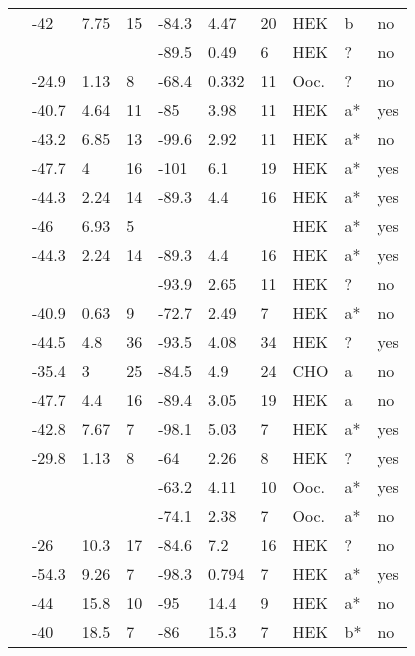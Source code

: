 \begin{footnotesize}
\begin{longtable}{p{5cm}|lll|lll|lll}
\citet{Valdivia2004MutationDB} & -42 & 7.75 & 15 & -84.3 & 4.47 & 20 & HEK & b & no \\
\citet{Vatta2002aMutationDB} & && & -89.5 & 0.49 & 6 & HEK & ? & no \\
\citet{Vatta2002bMutationDB} & -24.9 & 1.13 & 8 & -68.4 & 0.332 & 11 & Ooc. & ? & no \\
\citet{Viswanathan2003MutationDB} & -40.7 & 4.64 & 11 & -85 & 3.98 & 11 & HEK & a* & yes \\
\citet{Wang1996MutationDB} & -43.2 & 6.85 & 13 & -99.6 & 2.92 & 11 & HEK & a* & no \\
\citet{Wang2002MutationDB} & -47.7 & 4 & 16 & -101 & 6.1 & 19 & HEK & a* & yes \\
\citet{Wang2007aMutationDB} & -44.3 & 2.24 & 14 & -89.3 & 4.4 & 16 & HEK & a* & yes \\
\citet{Wang2007bMutationDB} & -46 & 6.93 & 5 & && & HEK & a* & yes \\
\citet{Wang2008MutationDB} & -44.3 & 2.24 & 14 & -89.3 & 4.4 & 16 & HEK & a* & yes \\
\citet{Wang2011MutationDB} & && & -93.9 & 2.65 & 11 & HEK & ? & no \\
\citet{Wang2015MutationDB} & -40.9 & 0.63 & 9 & -72.7 & 2.49 & 7 & HEK & a* & no \\
\citet{Wang2016MutationDB} & -44.5 & 4.8 & 36 & -93.5 & 4.08 & 34 & HEK & ? & yes \\
\citet{Watanabe2011bMutationDB} & -35.4 & 3 & 25 & -84.5 & 4.9 & 24 & CHO & a & no \\
\citet{Watanabe2011bMutationDB} & -47.7 & 4.4 & 16 & -89.4 & 3.05 & 19 & HEK & a & no \\
\citet{Wedekind2001MutationDB} & -42.8 & 7.67 & 7 & -98.1 & 5.03 & 7 & HEK & a* & yes \\
\citet{Wehrens2003MutationDB} & -29.8 & 1.13 & 8 & -64 & 2.26 & 8 & HEK & ? & yes \\
\citet{Wei1999MutationDB} & && & -63.2 & 4.11 & 10 & Ooc. & a* & yes \\
\citet{Wei1999MutationDB} & && & -74.1 & 2.38 & 7 & Ooc. & a* & no \\
\citet{Winkel2012MutationDB} & -26 & 10.3 & 17 & -84.6 & 7.2 & 16 & HEK & ? & no \\
\citet{Yang2002MutationDB} & -54.3 & 9.26 & 7 & -98.3 & 0.794 & 7 & HEK & a* & yes \\
\citet{Ye2003MutationDB} & -44 & 15.8 & 10 & -95 & 14.4 & 9 & HEK & a* & no \\
\citet{Ye2003MutationDB} & -40 & 18.5 & 7 & -86 & 15.3 & 7 & HEK & b* & no \\

\end{longtable}
\end{footnotesize}
